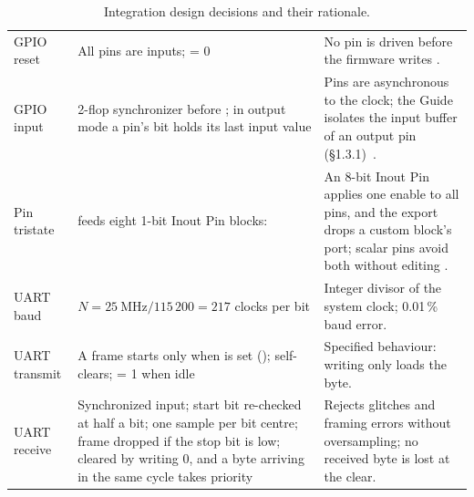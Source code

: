\begin{table}[H]
\caption[Integration design decisions]{Integration design decisions and their rationale.}
\label{tab:designdec}
{\tablestyle
\begin{tabularx}{\linewidth}{@{}P{22mm}P{68mm}L@{}}
\toprule
{} &  & \\
\midrule
GPIO reset & All pins are inputs;  = 0 & No pin is driven before the firmware writes .\\
GPIO input & 2-flop synchronizer before ; in output mode a pin's  bit holds its last input value & Pins are asynchronous to the clock; the Guide isolates the input buffer of an output pin (§1.3.1)~\cite{blockguide}.\\
Pin tristate &  feeds eight 1-bit Inout Pin blocks:  & An 8-bit Inout Pin applies one enable to all pins, and the export drops a custom block's  port; scalar pins avoid both without editing .\\
UART baud & $N = 25\ \mathrm{MHz} / 115\,200 = 217$ clocks per bit & Integer divisor of the system clock; 0.01\,\% baud error.\\
UART transmit & A frame starts only when  is set ();  self-clears;  = 1 when idle & Specified behaviour: writing  only loads the byte.\\
UART receive & Synchronized input; start bit re-checked at half a bit; one sample per bit centre; frame dropped if the stop bit is low;  cleared by writing 0, and a byte arriving in the same cycle takes priority & Rejects glitches and framing errors without oversampling; no received byte is lost at the clear.\\
\bottomrule
\end{tabularx}}
\end{table}
